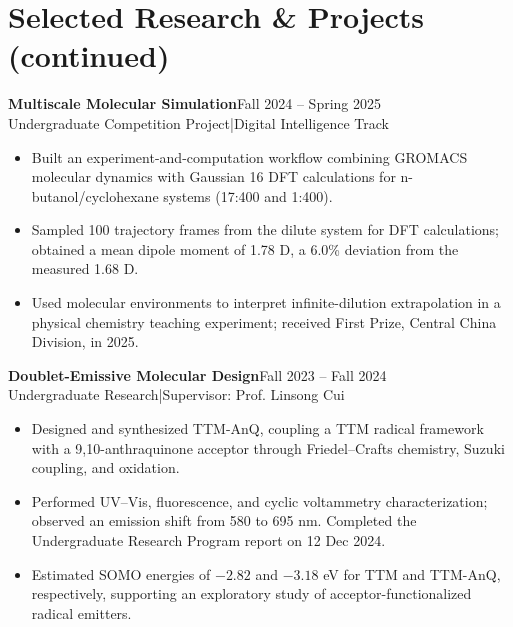 \documentclass[11pt,a4paper]{article}
\newcommand{\entry}[3]{\textbf{#1}\hfill {\small #2}\\{\small #3}\par}
\begin{document}
\newpage
\section{Selected Research \& Projects (continued)}
\entry{Multiscale Molecular Simulation}{Fall 2024 -- Spring 2025}{Undergraduate Competition Project\enspace |\enspace Digital Intelligence Track}
\begin{itemize}
    \item Built an experiment-and-computation workflow combining GROMACS molecular dynamics with Gaussian 16 DFT calculations for n-butanol/cyclohexane systems (17:400 and 1:400).
    \item Sampled 100 trajectory frames from the dilute system for DFT calculations; obtained a mean dipole moment of 1.78 D, a 6.0\% deviation from the measured 1.68 D.
    \item Used molecular environments to interpret infinite-dilution extrapolation in a physical chemistry teaching experiment; received First Prize, Central China Division, in 2025.
\end{itemize}
\vspace{4pt}
\entry{Doublet-Emissive Molecular Design}{Fall 2023 -- Fall 2024}{Undergraduate Research\enspace |\enspace Supervisor: Prof. Linsong Cui}
\begin{itemize}
    \item Designed and synthesized TTM-AnQ, coupling a TTM radical framework with a 9,10-anthraquinone acceptor through Friedel--Crafts chemistry, Suzuki coupling, and oxidation.
    \item Performed UV--Vis, fluorescence, and cyclic voltammetry characterization; observed an emission shift from 580 to 695 nm. Completed the Undergraduate Research Program report on 12 Dec 2024.
    \item Estimated SOMO energies of $-2.82$ and $-3.18$ eV for TTM and TTM-AnQ, respectively, supporting an exploratory study of acceptor-functionalized radical emitters.
\end{itemize}
\end{document}
